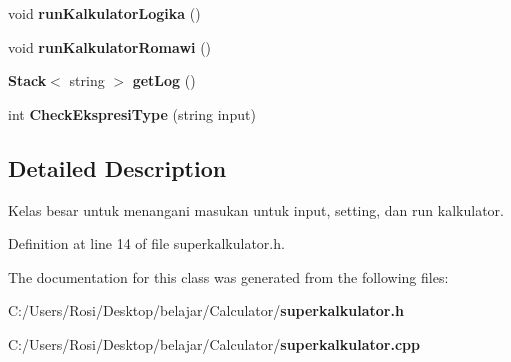 \begin{CompactItemize}
\item 
void {\bf run\-Kalkulator\-Logika} ()\label{classsuperkalkulator_82a3e4e15373f23895e7496b3a71e077}

\item 
void {\bf run\-Kalkulator\-Romawi} ()\label{classsuperkalkulator_a35b0eb0639cbd097c981373dd64bff9}

\item 
{\bf Stack}$<$ string $>$ {\bf get\-Log} ()\label{classsuperkalkulator_d8d5f04f9c7dfee29b760afce7443fca}

\item 
int {\bf Check\-Ekspresi\-Type} (string input)\label{classsuperkalkulator_d6c80f4809273751b6fab73840783eb2}

\end{CompactItemize}


\subsection{Detailed Description}
Kelas besar untuk menangani masukan untuk input, setting, dan run kalkulator. 



Definition at line 14 of file superkalkulator.h.

The documentation for this class was generated from the following files:\begin{CompactItemize}
\item 
C:/Users/Rosi/Desktop/belajar/Calculator/{\bf superkalkulator.h}\item 
C:/Users/Rosi/Desktop/belajar/Calculator/{\bf superkalkulator.cpp}\end{CompactItemize}
